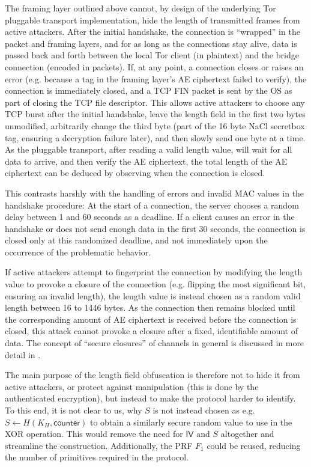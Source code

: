The framing layer outlined above cannot, by design of the underlying Tor pluggable transport implementation, hide the length of transmitted frames from active attackers.
After the initial handshake, the connection is ``wrapped'' in the packet and framing layers, and for as long as the connections stay alive, data is passed back and forth between the local Tor client (in plaintext) and the bridge connection (encoded in packets).
If, at any point, a connection closes or raises an error (e.g. because a tag in the framing layer's AE ciphertext failed to verify), the connection is immediately closed, and a TCP FIN packet is sent by the OS as part of closing the TCP file descriptor.
This allows active attackers to choose any TCP burst after the initial handshake, leave the length field in the first two bytes unmodified, arbitrarily change the third byte (part of the 16 byte NaCl secretbox tag, ensuring a decryption failure later), and then slowly send one byte at a time. As the pluggable transport, after reading a valid length value, will wait for all data to arrive, and then verify the AE ciphertext, the total length of the AE ciphertext can be deduced by observing when the connection is closed.

This contrasts harshly with the handling of errors and invalid MAC values in the handshake procedure: At the start of a connection, the server chooses a random delay between 1 and 60 seconds as a deadline. If a client causes an error in the handshake or does not send enough data in the first 30 seconds, the connection is closed only at this randomized deadline, and not immediately upon the occurrence of the problematic behavior.

If active attackers attempt to fingerprint the connection by modifying the length value to provoke a closure of the connection (e.g. flipping the most significant bit, ensuring an invalid length), the length value is instead chosen as a random valid length between 16 to 1446 bytes. As the connection then remains blocked until the corresponding amount of AE ciphertext is received before the connection is closed, this attack cannot provoke a closure after a fixed, identifiable amount of data. The concept of ``secure closures'' of channels in general is discussed in more detail in \cite{CCS:FenJoh24}.

The main purpose of the length field obfuscation is therefore not to hide it from active attackers, or protect against manipulation (this is done by the authenticated encryption), but instead to make the protocol harder to identify. To this end, it is not clear to us, why $S$ is not instead chosen as e.g.~$S \gets H(K_H, \mathsf{counter})$ to obtain a similarly secure random value to use in the XOR operation. This would remove the need for $\mathsf{IV}$ and $S$ altogether and streamline the construction. Additionally, the \drivel{} PRF $F_1$ could be reused, reducing the number of primitives required in the protocol.

